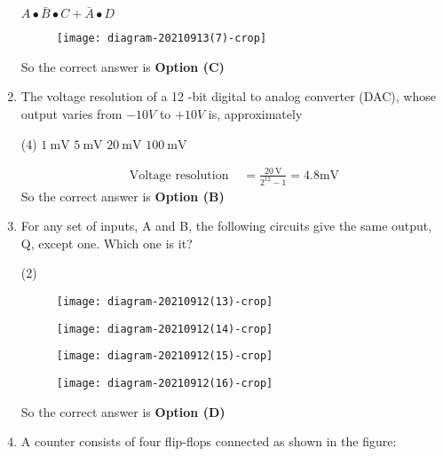 \begin{enumerate}
\begin{tasks}
\task[\textbf{D.}]  $A \bullet \bar{B} \bullet C+\bar{A} \bullet D$
\end{tasks}
\begin{answer}
\begin{figure}[H]
	\centering
	\texttt{[image: diagram-20210913(7)-crop]}
\end{figure}
So the correct answer is \textbf{Option (C)}
\end{answer}
	\item The voltage resolution of a 12 -bit digital to analog converter (DAC), whose output varies from $-10 V$ to $+10 V$ is, approximately
\begin{tasks}(4)
\task[\textbf{A.}] $1\  \mathrm{mV}$
\task[\textbf{B.}] $5 \ \mathrm{mV}$
\task[\textbf{C.}] $20 \ \mathrm{mV}$
\task[\textbf{D.}] $100 \ \mathrm{mV}$
\end{tasks}
\begin{answer}
\begin{align*}
\text{Voltage resolution }&=\frac{20 \mathrm{~V}}{2^{12}-1}=4.8 \mathrm{mV}
\end{align*}
So the correct answer is \textbf{Option (B)}
\end{answer}
	\item For any set of inputs, A and B, the following circuits give the same output, Q, except one. Which one is it?
\begin{tasks}(2)
\task[\textbf{A.}] \begin{figure}[H]
	\centering
	\texttt{[image: diagram-20210912(13)-crop]}
\end{figure}
\task[\textbf{B.}]\begin{figure}[H]
	\centering
	\texttt{[image: diagram-20210912(14)-crop]}
\end{figure}
\task[\textbf{C.}] \begin{figure}[H]
	\centering
	\texttt{[image: diagram-20210912(15)-crop]}
\end{figure}
\task[\textbf{D.}]\begin{figure}[H]
	\centering
	\texttt{[image: diagram-20210912(16)-crop]}
\end{figure}
\end{tasks}
\begin{answer}
So the correct answer is \textbf{Option (D)}
\end{answer}
	\item A counter consists of four flip-flops connected as shown in the figure:\\

\end{enumerate}
